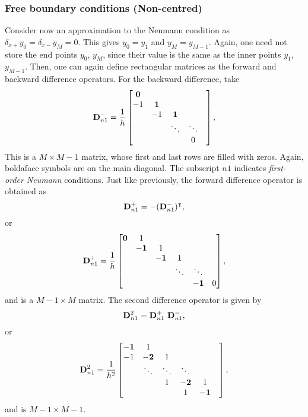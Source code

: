 \subsubsection{Free boundary conditions (Non-centred)}
Consider now an approximation to the Neumann condition as $\delta_{x+}y_0 = \delta_{x-}y_M=0$. This gives $y_0=y_1$ and $y_M=y_{M-1}$. Again, one need not store the end points $y_0$, $y_M$, since their value is the same as the inner points $y_1$, $y_{M-1}$. Then, one can again define rectangular matrices as the forward and backward difference operators. For the backward difference, take
\begin{equation}
{\bf D}^-_{n1}  = \frac{1}{h}\begin{bmatrix}
{\bf 0} &  &   &   \\ 
-1& {\bf 1} & & &    \\
&-1 & {\bf 1} & &    \\
& & \ddots & \ddots &    \\
& &  & 0&   
\end{bmatrix},
\end{equation}
This is a $M \times M-1$ matrix, whose first and last rows are filled with zeros. Again, boldaface symbols are on the main diagonal. The subscript ${n1}$ indicates \emph{first-order Neumann} conditions. Just like previously, the forward difference operator is obtained as
\begin{equation}
{\bf D}^+_{n1} = -({\bf D}^-_{n1})^\intercal,
\end{equation}
or
\begin{equation}
{\bf D}^+_{n1} = \frac{1}{h}\begin{bmatrix}
{\bf 0} &  1 &   &   &\\ 
& {\bf -1} & 1 & &  &  \\
& & {\bf -1} & 1&   & \\
& & & \ddots &  \ddots & \\
& & &  & {\bf -1}&   0
\end{bmatrix},
\end{equation}
and is a $M-1\times M$ matrix. The second difference operator is given by
\begin{equation}\label{eq:SecondDiffMatNeumann}
{\bf D}^2_{n1} = {\bf D}^+_{n1} \,\, {\bf D}^-_{n1},
\end{equation}
or
\begin{equation}\label{eq:D2Neum1}
{\bf D}^2_{n1} = \frac{1}{h^2}\begin{bmatrix}
{\bf -1}& 1&   &  &  &  \\ 
-1& {\bf -2} & 1 &  &  &\\
& \ddots & \ddots & \ddots &  &      \\
& &  1 & {\bf -2}& 1   \\
& &   & 1 & {\bf -1}   \\
\end{bmatrix},
\end{equation}
and is $M-1 \times M-1$.



